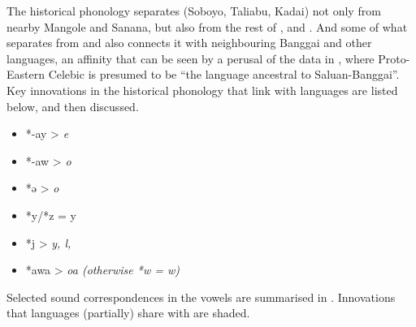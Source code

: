 The historical phonology separates  (Soboyo,
Taliabu, Kadai) not only from nearby Mangole
and Sanana, but also from the rest of ,  and .
And some of what separates  from 
and  also connects it with neighbouring Banggai
and other  languages,
an affinity that can be seen by a perusal of the data in
\citet{Mead2003a,Mead2003b}, where Proto-Eastern Celebic is presumed to be “the
language ancestral to Saluan-Banggai”.
Key innovations in the historical phonology that link 
with  languages are listed below,
and then discussed.

\begin{itemize}[noitemsep]
	\item	*-ay > \it{e}
	\item	*-aw > \it{o}
	\item	*ə > \it{o}
	\item	*y/*z = y
	\item	*j > \it{y, l}, {\0}
	\item	*awa > \it{oa} (otherwise *w = \it{w})
\end{itemize}

\newpage
Selected sound correspondences in the vowels are summarised in .
Innovations that  languages (partially) share with
 are shaded.

